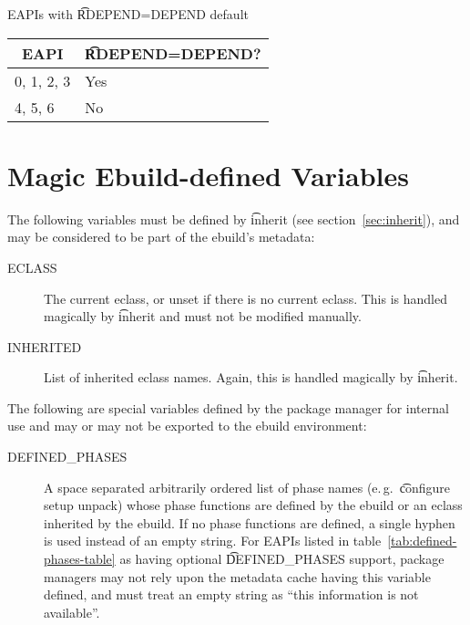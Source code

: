 \begin{centertable}{EAPIs with \t{RDEPEND=DEPEND} default}
    \label{tab:rdepend-depend-table}
    \begin{tabular}{ll}
      \toprule
      \multicolumn{1}{c}{\textbf{EAPI}} &
      \multicolumn{1}{c}{\textbf{\t{RDEPEND=DEPEND}?}} \\
      \midrule
      0, 1, 2, 3        & Yes \\
      4, 5, 6           & No  \\
      \bottomrule
    \end{tabular}
\end{centertable}

\section{Magic Ebuild-defined Variables}

The following variables must be defined by \t{inherit} (see section~\ref{sec:inherit}), and may be
considered to be part of the ebuild's metadata:

\begin{description}
\item[ECLASS] The current eclass, or unset if there is no current eclass. This is handled magically
    by \t{inherit} and must not be modified manually.
\item[INHERITED] List of inherited eclass names. Again, this is handled magically by \t{inherit}.
\end{description}


The following are special variables defined by the package manager for internal use and may or may
not be exported to the ebuild environment:

\begin{description}
\item[DEFINED_PHASES]  A space separated arbitrarily ordered list of
phase names (e.\,g.\ \t{configure setup unpack}) whose phase functions are defined by the ebuild or
an eclass inherited by the ebuild. If no phase functions are defined, a single hyphen is used
instead of an empty string. For EAPIs listed in table~\ref{tab:defined-phases-table} as having
optional \t{DEFINED_PHASES} support, package managers may not rely upon the metadata cache having
this variable defined, and must treat an empty string as ``this information is not available''.
\end{description}

